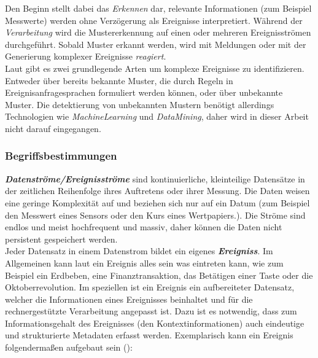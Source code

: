 \documentclass{acm_proc_article-sp}
\begin{document}
Den Beginn stellt dabei das \emph{Erkennen} dar, relevante Informationen (zum Beispiel 
Messwerte) werden ohne Verzögerung als Ereignisse interpretiert. Während der 
\emph{Verarbeitung} wird die Mustererkennung auf einen oder mehreren Ereignisströmen 
durchgeführt. Sobald Muster erkannt werden, wird mit Meldungen oder mit 
der Generierung komplexer Ereignisse \emph{reagiert}.\\
Laut \cite{eckert} gibt es zwei grundlegende Arten um 
komplexe Ereignisse zu identifizieren. Entweder über bereits bekannte Muster, die durch 
Regeln in Ereignisanfragesprachen formuliert werden können, oder über unbekannte Muster. 
Die detektierung von unbekannten Mustern benötigt allerdings Technologien wie 
\textit{MachineLearning} und \textit{DataMining}, daher wird in dieser Arbeit nicht 
darauf eingegangen.

\subsubsection{Begriffsbestimmungen}\label{begriffsbestimmung}
\vspace{0.1cm}
\textbf{\textit{Datenströme/Ereignisströme}}
sind kontinuierliche, kleinteilige Datensätze in der 
zeitlichen Reihenfolge ihres Auftretens oder ihrer Messung. Die Daten weisen eine geringe 
Komplexität auf und beziehen sich nur auf ein Datum (zum Beispiel den Messwert eines 
Sensors oder den Kurs eines Wertpapiers.). Die Ströme sind endlos und meist 
hochfrequent und massiv, daher können die Daten nicht persistent gespeichert werden.\\
Jeder Datensatz in einem Datenstrom bildet ein eigenes 
\textbf{\textit{Ereigniss}}. Im 
Allgemeinen kann laut \cite{glossary} ein Ereignis alles sein was eintreten kann, wie zum 
Beispiel ein Erdbeben, eine Finanztransaktion, das Betätigen einer Taste oder die 
Oktoberrevolution. Im speziellen ist ein Ereignis ein aufbereiteter Datensatz, welcher 
die Informationen eines Ereignisses beinhaltet und für die rechnergestützte Verarbeitung 
angepasst ist. Dazu ist es notwendig, dass zum Informationsgehalt des Ereignisses (den 
Kontextinformationen) auch eindeutige und strukturierte Metadaten erfasst werden. 
Exemplarisch 
kann ein Ereignis folgendermaßen aufgebaut sein (\cite{hedtstuck}):
\end{document}
